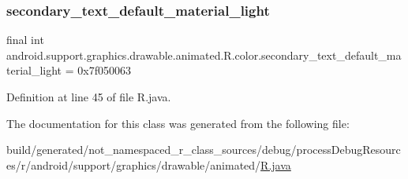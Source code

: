 \subsubsection{\texorpdfstring{secondary\_text\_default\_material\_light}{secondary\_text\_default\_material\_light}}
{\footnotesize\ttfamily final int android.\+support.\+graphics.\+drawable.\+animated.\+R.\+color.\+secondary\+\_\+text\+\_\+default\+\_\+material\+\_\+light = 0x7f050063\hspace{0.3cm}{\ttfamily [static]}}



Definition at line 45 of file R.\+java.



The documentation for this class was generated from the following file\+:\begin{DoxyCompactItemize}
\item 
build/generated/not\+\_\+namespaced\+\_\+r\+\_\+class\+\_\+sources/debug/process\+Debug\+Resources/r/android/support/graphics/drawable/animated/\mbox{\hyperlink{android_2support_2graphics_2drawable_2animated_2_r_8java}{R.\+java}}\end{DoxyCompactItemize}
